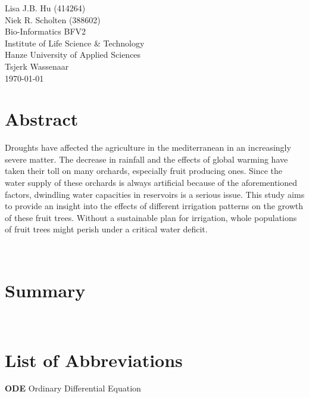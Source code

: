 \normalsize
\vspace*{\fill}
\begin{flushright}
Lisa J.B. Hu (414264)\\
Niek R. Scholten (388602)\\
Bio-Informatics BFV2\\
Institute of Life Science \& Technology\\
Hanze University of Applied Sciences\\
Tsjerk Wassenaar\\
\today
\end{flushright}
\newpage

\section*{Abstract}

Droughts have affected the agriculture in the mediterranean in an increasingly severe matter.
The decrease in rainfall and the effects of global warming have taken their toll on many orchards, especially fruit producing ones.
Since the water supply of these orchards is always artificial because of the aforementioned factors, dwindling water capacities in reservoirs is a serious issue.
This study aims to provide an insight into the effects of different irrigation patterns on the growth of these fruit trees.
Without a sustainable plan for irrigation, whole populations of fruit trees might perish under a critical water deficit.

\label{sec:abstract}~
\newpage

\section*{Summary}

\label{sec:summ}~
\newpage

\section*{List of Abbreviations}

\textbf{ODE} Ordinary Differential Equation

\label{sec:abvs}~

\newpage